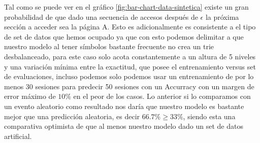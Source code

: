 	Tal como se puede ver en el gráfico \ref{fig:bar-chart-data-sintetica} existe un gran probabilidad de que dado una secuencia de accesos después de $\epsilon$ la próxima sección a acceder sea la página A.
	Esto es adicionalmente es consistente a el tipo de set de datos que hemos ocupado ya que con esto podemos delimitar a que nuestro modelo al tener símbolos bastante frecuente no crea un trie desbalanceado, para este caso solo acota constantemente a un altura de 5 niveles y una variación mínima entre la exactitud, que posee el entrenamiento versus set de evaluaciones, incluso podemos solo podemos usar un entrenamiento de por lo menos 30 sesiones para predecir 50 sesiones con un Accurracy con un margen de error máximo de $10\%$ en el peor de los casos. 
	Lo anterior si lo comparamos con un evento aleatorio como resultado nos daría que nuestro modelo es bastante mejor que una predicción aleatoria, es decir $ 66.7\%  \geq 33\%$, siendo esta una comparativa optimista de que al menos nuestro modelo dado un set de datos artificial.
	



	